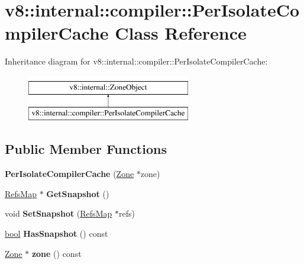 \hypertarget{classv8_1_1internal_1_1compiler_1_1PerIsolateCompilerCache}{}\section{v8\+:\+:internal\+:\+:compiler\+:\+:Per\+Isolate\+Compiler\+Cache Class Reference}
\label{classv8_1_1internal_1_1compiler_1_1PerIsolateCompilerCache}
Inheritance diagram for v8\+:\+:internal\+:\+:compiler\+:\+:Per\+Isolate\+Compiler\+Cache\+:\begin{figure}[H]
\begin{center}
\leavevmode
\includegraphics[height=2.000000cm]{classv8_1_1internal_1_1compiler_1_1PerIsolateCompilerCache}
\end{center}
\end{figure}
\subsection*{Public Member Functions}
\begin{DoxyCompactItemize}
\item 
\mbox{\label{classv8_1_1internal_1_1compiler_1_1PerIsolateCompilerCache_aa5d84754f7272c81be4269a9680dcbb2}} 
{\bfseries Per\+Isolate\+Compiler\+Cache} (\mbox{\hyperlink{classv8_1_1internal_1_1Zone}{Zone}} $\ast$zone)
\item 
\mbox{\label{classv8_1_1internal_1_1compiler_1_1PerIsolateCompilerCache_a9c257c1ca6536beac96aa5f00b1e2f46}} 
\mbox{\hyperlink{classv8_1_1internal_1_1compiler_1_1RefsMap}{Refs\+Map}} $\ast$ {\bfseries Get\+Snapshot} ()
\item 
\mbox{\label{classv8_1_1internal_1_1compiler_1_1PerIsolateCompilerCache_a272b158ad65cfa59a44392dc5df00310}} 
void {\bfseries Set\+Snapshot} (\mbox{\hyperlink{classv8_1_1internal_1_1compiler_1_1RefsMap}{Refs\+Map}} $\ast$refs)
\item 
\mbox{\label{classv8_1_1internal_1_1compiler_1_1PerIsolateCompilerCache_abdd077be14e769cc1cba220090e6a418}} 
\mbox{\hyperlink{classbool}{bool}} {\bfseries Has\+Snapshot} () const
\item 
\mbox{\label{classv8_1_1internal_1_1compiler_1_1PerIsolateCompilerCache_a81b7a736b9805980064df2910cc9e316}} 
\mbox{\hyperlink{classv8_1_1internal_1_1Zone}{Zone}} $\ast$ {\bfseries zone} () const
\end{DoxyCompactItemize}
